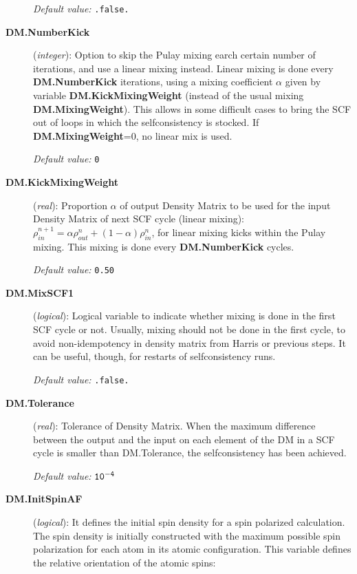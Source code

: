 \documentclass[11pt]{article}
\begin{document}
\begin{description}
{\it Default value:} {\tt .false.}

\item[{\bf DM.NumberKick}] ({\it integer}): 
Option to skip the Pulay mixing earch certain number of iterations,
and use a linear mixing instead. Linear mixing is done
every {\bf DM.NumberKick} iterations, using a mixing coefficient
$\alpha$ given by variable {\bf DM.KickMixingWeight} 
(instead of the usual mixing {\bf DM.MixingWeight}).
This allows in some difficult cases to bring the SCF out of
loops in which the selfconsistency is stocked.
If {\bf DM.MixingWeight}=0, no linear mix is used.

{\it Default value:} {\tt 0}

\item[{\bf DM.KickMixingWeight}] ({\it real}):
Proportion $\alpha$ of 
output Density Matrix to be used for the input Density Matrix of 
next SCF cycle (linear mixing):
$\rho^{n+1}_{in} = \alpha \rho^{n}_{out} 
+(1 - \alpha) \rho^{n}_{in}$, for linear mixing kicks within the
Pulay mixing. This mixing is done every {\bf DM.NumberKick} cycles.

{\it Default value:} {\tt 0.50}



\item[{\bf DM.MixSCF1}] ({\it logical}):
Logical variable to indicate whether mixing is done in the
first SCF cycle or not. Usually, mixing should not be done in
the first cycle, to avoid non-idempotency in density matrix
from Harris or previous steps. It can be useful, though,
for restarts of selfconsistency runs.

{\it Default value:} {\tt .false.}



\item[{\bf DM.Tolerance}] ({\it real}): 
Tolerance of Density Matrix.
When the maximum difference between the output and the
input on each element of the DM 
in a SCF cycle is smaller than DM.Tolerance,
the selfconsistency has been achieved.

{\it Default value:} {${\tt 10^{-4}}$}

\item[{\bf DM.InitSpinAF}] ({\it logical}):
It defines the initial spin density for a spin polarized calculation. 
The spin density is initially constructed with the maximum possible
spin polarization for each atom in its atomic configuration.
This variable defines the relative orientation of the atomic
spins: 


\end{description}
\end{document}
